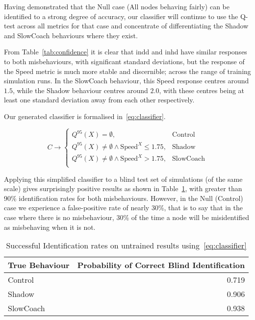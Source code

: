 Having demonstrated that the Null case (All nodes behaving fairly) can be identified to a strong degree of accuracy, our classifier will continue to use the Q-test across all metrics for that case and concentrate of differentiating the Shadow and SlowCoach behaviours where they exist.

From Table~\ref{tab:confidence} it is clear that \gls{indd} and \gls{inhd} have similar responses to both misbehaviours, with significant standard deviations, but the response of the Speed metric is much more stable and discernible; across the range of training simulation runs.
In the SlowCoach behaviour, this Speed response centres around $1.5$, while the Shadow behaviour centres around $2.0$, with these centres being at least one standard deviation away from each other respectively.

Our generated classifier is formalised in~\eqref{eq:classifier}.

\begin{equation}
  C \rightarrow 
  \begin{cases}
    Q^{95}(X) = \emptyset,& \text{Control}\\
    Q^{95}(X) \neq \emptyset \land \text{Speed}^X \leq 1.75, & \text{Shadow}\\
    Q^{95}(X) \neq \emptyset \land \text{Speed}^X > 1.75,& \text{SlowCoach}\\
  \end{cases}
  \label{eq:classifier}
\end{equation}

Applying this simplified classifier to a blind test set of simulations (of the same scale) gives surprisingly positive results as shown in Table~\ref{tab:classifier}, with greater than 90\% identification rates for both misbehaviours.
However, in the Null (Control) case we experience a false-positive rate of nearly 30\%, that is to say that in the case where there is no misbehaviour, 30\% of the time a node will be misidentified as misbehaving when it is not.

\begin{table}[h]
  \caption{Successful Identification rates on untrained results using~\eqref{eq:classifier}}
  \centering
  \begin{tabular}{lr}
    \toprule
    True Behaviour &  Probability of Correct Blind Identification \\
    \midrule
    Control        &                                        0.719 \\
    Shadow         &                                        0.906 \\
    SlowCoach      &                                        0.938 \\
    \bottomrule
  \end{tabular}
  \label{tab:classifier}
\end{table}

